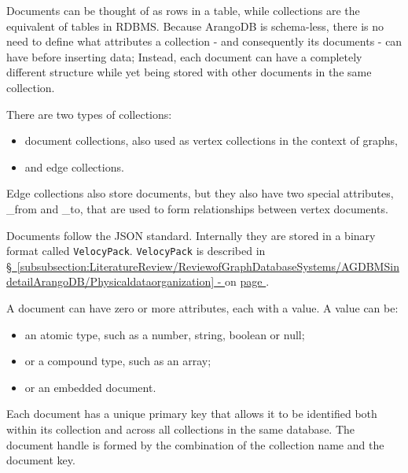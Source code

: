 Documents can be thought of as rows in a table, while collections are the equivalent of tables in RDBMS.
Because ArangoDB is schema-less, there is no need to define what attributes a collection - and consequently its documents - can have before inserting data;
Instead, each document can have a completely different structure while yet being stored with other documents in the same collection.

There are two types of collections:
 \begin{itemize}[noitemsep]
	\item document collections, also used as vertex collections in the context of graphs,
	\item and edge collections.
\end{itemize}
Edge collections also store documents, but they also have two special attributes, \_from and \_to, that are used to form relationships between vertex documents.

Documents follow the JSON standard.
Internally they are stored in a binary format called \texttt{VelocyPack}.
\texttt{VelocyPack} is described in \hyperref[subsubsection:LiteratureReview/ReviewofGraphDatabaseSystems/AGDBMSindetailArangoDB/Physicaldataorganization]{\S\ \ref{subsubsection:LiteratureReview/ReviewofGraphDatabaseSystems/AGDBMSindetailArangoDB/Physicaldataorganization} - } on \hyperref[subsubsection:LiteratureReview/ReviewofGraphDatabaseSystems/AGDBMSindetailArangoDB/Physicaldataorganization]{page \pageref*{subsubsection:LiteratureReview/ReviewofGraphDatabaseSystems/AGDBMSindetailArangoDB/Physicaldataorganization}}.

A document can have zero or more attributes, each with a value.
A value can be:
 \begin{itemize}[noitemsep]
	\item an atomic type, such as a number, string, boolean or null;
	\item or a compound type, such as an array;
	\item or an embedded document.
\end{itemize}

Each document has a unique primary key that allows it to be identified both within its collection and across all collections in the same database.
The document handle is formed by the combination of the collection name and the document key.

